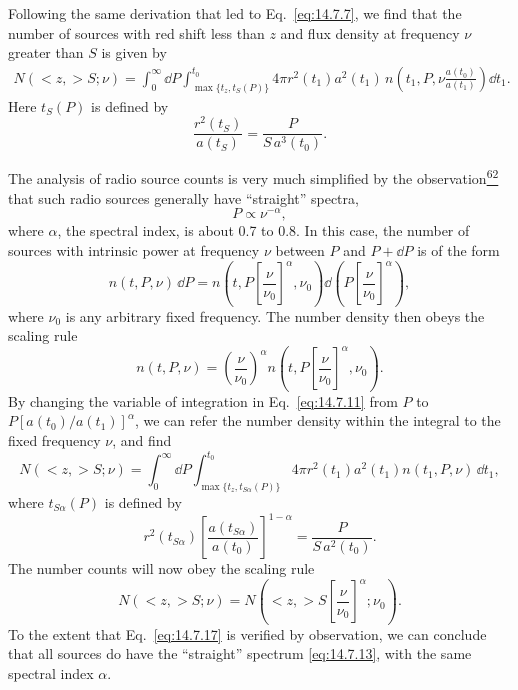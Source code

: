Following the same derivation that led to Eq.~\eqref{eq:14.7.7}, we find
that the number of sources with red shift less than \(z\) and flux density
at frequency \(\nu\) greater than \(S\) is given by
\begin{align}
  N(<z,>S;\nu)
  =
  \int_0^\infty\dd P
  \int_{\max\{t_z,t_S(P)\}}^{t_0}
  4\pi r^2(t_1)a^2(t_1)\,
  n\!\left(
    t_1,P,\nu\frac{a(t_0)}{a(t_1)}
  \right)
  \dd t_1.
  \tag{14.7.11}\label{eq:14.7.11}
\end{align}
Here \(t_S(P)\) is defined by
\begin{equation}
  \frac{r^2(t_S)}{a(t_S)}
  =
  \frac{P}{S\,a^3(t_0)}.
  \tag{14.7.12}\label{eq:14.7.12}
\end{equation}

The analysis of radio source counts is very much simplified by the
observation\hyperref[ch14-ref-62]{\textsuperscript{62}} that such radio
sources generally have ``straight'' spectra,
\begin{equation}
  P\propto\nu^{-\alpha},
  \tag{14.7.13}\label{eq:14.7.13}
\end{equation}
where \(\alpha\), the spectral index, is about 0.7 to 0.8. In this case, the
number of sources with intrinsic power at frequency \(\nu\) between \(P\)
and \(P+\dd P\) is of the form
\[
  n(t,P,\nu)\,\dd P
  =
  n\!\left(
    t,P\left[\frac{\nu}{\nu_0}\right]^\alpha,\nu_0
  \right)
  \dd\!\left(
    P\left[\frac{\nu}{\nu_0}\right]^\alpha
  \right),
\]
where \(\nu_0\) is any arbitrary fixed frequency. The number density then
obeys the scaling rule
\begin{equation}
  n(t,P,\nu)
  =
  \left(\frac{\nu}{\nu_0}\right)^\alpha
  n\!\left(
    t,P\left[\frac{\nu}{\nu_0}\right]^\alpha,\nu_0
  \right).
  \tag{14.7.14}\label{eq:14.7.14}
\end{equation}
By changing the variable of integration in Eq.~\eqref{eq:14.7.11} from
\(P\) to \(P[a(t_0)/a(t_1)]^\alpha\), we can refer the number density within
the integral to the fixed frequency \(\nu\), and find
\begin{equation}
  N(<z,>S;\nu)
  =
  \int_0^\infty\dd P
  \int_{\max\{t_z,t_{S\alpha}(P)\}}^{t_0}
  4\pi r^2(t_1)a^2(t_1)n(t_1,P,\nu)\,\dd t_1,
  \tag{14.7.15}\label{eq:14.7.15}
\end{equation}
where \(t_{S\alpha}(P)\) is defined by
\begin{equation}
  r^2(t_{S\alpha})
  \left[
    \frac{a(t_{S\alpha})}{a(t_0)}
  \right]^{1-\alpha}
  =
  \frac{P}{S\,a^2(t_0)}.
  \tag{14.7.16}\label{eq:14.7.16}
\end{equation}
The number counts will now obey the scaling rule
\begin{equation}
  N(<z,>S;\nu)
  =
  N\!\left(
    <z,>S\left[\frac{\nu}{\nu_0}\right]^\alpha;\nu_0
  \right).
  \tag{14.7.17}\label{eq:14.7.17}
\end{equation}
To the extent that Eq.~\eqref{eq:14.7.17} is verified by observation, we
can conclude that all sources do have the ``straight'' spectrum
\eqref{eq:14.7.13}, with the same spectral index \(\alpha\).

